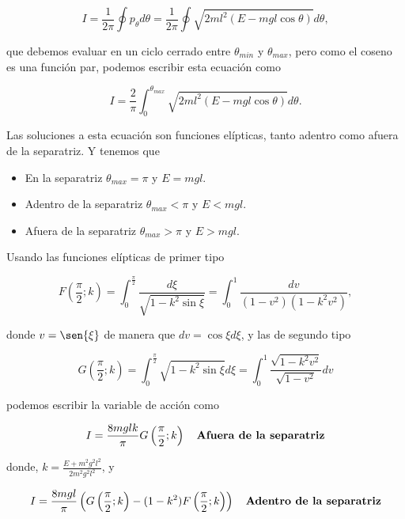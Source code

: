 \documentclass[a4paper,10pt]{article}
\numberwithin{equation}{section}
\begin{document}
\begin{equation}
 I = \frac{1}{2\pi}\oint p_\theta d\theta = 
 \frac{1}{2\pi}\oint \sqrt{2ml^2(E - mgl\cos{\theta})} d\theta,
\end{equation}

que debemos evaluar en un ciclo cerrado entre $\theta_{min}$ y $\theta_{max}$, pero 
como el coseno es una función par, podemos escribir esta ecuación como 

\begin{equation}
 I = \frac{2}{\pi}\int_0^{\theta_{max}}  \sqrt{2ml^2(E - mgl\cos{\theta})} d\theta.
\end{equation}

Las soluciones a esta ecuación son funciones elípticas, tanto adentro como afuera de 
la separatriz. Y tenemos que 

\begin{itemize}
 \item En la separatriz $\theta_{max} = \pi$ y $E = mgl$.
 \item Adentro de la separatriz $\theta_{max} < \pi$ y $E < mgl$.
 \item Afuera de la separatriz $\theta_{max} > \pi$ y $E > mgl$.
\end{itemize}

Usando las funciones elípticas de primer tipo

\begin{equation}
 F\left(\frac{\pi}{2};k\right) = \int_0^{\frac{\pi}{2}} \frac{d\xi}{\sqrt{1 - k^2\sin{\xi}}} 
 = \int_0^1 \frac{dv}{(1-v^2)(1-k^2v^2)},
\end{equation}

donde $v=\sen{\xi}$ de manera que $dv = \cos{\xi}d\xi$, y las de segundo tipo 

\begin{equation}
 G\left(\frac{\pi}{2};k\right) = \int_0^{\frac{\pi}{2}} \sqrt{1 - k^2\sin{\xi}}d\xi = 
 \int_0^1 \frac{\sqrt{1 - k^2v^2}}{\sqrt{1 - v^2}}dv
\end{equation}

podemos escribir la variable de acción como

\begin{equation}
 I = \frac{8mglk}{\pi}G\left(\frac{\pi}{2};k\right) \quad \text{\textbf{Afuera de la 
 separatriz}}
\end{equation}

donde, $k = \frac{E + m^2g^2l^2}{2 m^2g^2l^2}$, y 

\begin{equation}
 I = \frac{8mgl}{\pi}\left(G\left(\frac{\pi}{2};k\right) - (1 - k^2)F\left(\frac{\pi}{2};k\right)\right) 
 \quad \text{\textbf{Adentro de la separatriz}}
\end{equation}
\end{document}
